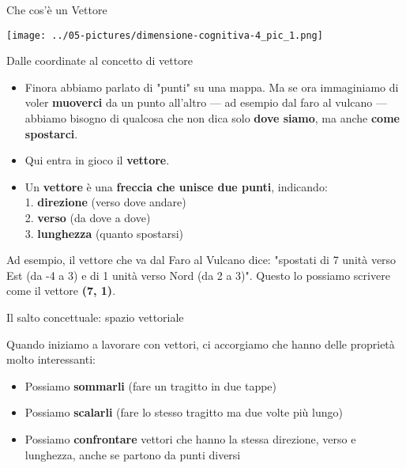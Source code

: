 \documentclass[aspectratio=169]{beamer}
\begin{document}
%
\begin{frame}{Che cos'è un Vettore}
\begin{center}
\texttt{[image: ../05-pictures/dimensione-cognitiva-4\_pic\_1.png]} 
\end{center}
\end{frame}
%
%
\begin{frame}{Dalle coordinate al concetto di vettore}
\begin{itemize}
\item Finora abbiamo parlato di "punti" su una mappa. Ma se ora immaginiamo di voler \textbf{muoverci} da un punto all'altro — ad esempio dal faro al vulcano — abbiamo bisogno di qualcosa che non dica solo \textbf{dove siamo}, ma anche \textbf{come spostarci}.

\item Qui entra in gioco il \textbf{vettore}.

\item Un \textbf{vettore} è una \textbf{freccia che unisce due punti}, indicando:\\

1. \textbf{direzione} (verso dove andare)\\
2. \textbf{verso} (da dove a dove)\\
3. \textbf{lunghezza} (quanto spostarsi)\\
\end{itemize}
\vspace{.2cm}
\small
Ad esempio, il vettore che va dal Faro al Vulcano dice: "spostati di 7 unità verso Est (da -4 a 3) e di 1 unità verso Nord (da 2 a 3)". Questo lo possiamo scrivere come il vettore \textbf{(7, 1)}.

\end{frame}
%
%
\begin{frame}{Il salto concettuale: spazio vettoriale}

Quando iniziamo a lavorare con vettori, ci accorgiamo che hanno delle proprietà molto interessanti:
\begin{itemize}
\item Possiamo \textbf{sommarli} (fare un tragitto in due tappe)
\item Possiamo \textbf{scalarli} (fare lo stesso tragitto ma due volte più lungo)
\item Possiamo \textbf{confrontare} vettori che hanno la stessa direzione, verso e lunghezza, anche se partono da punti diversi
\end{itemize}
\end{frame}
\end{document}
